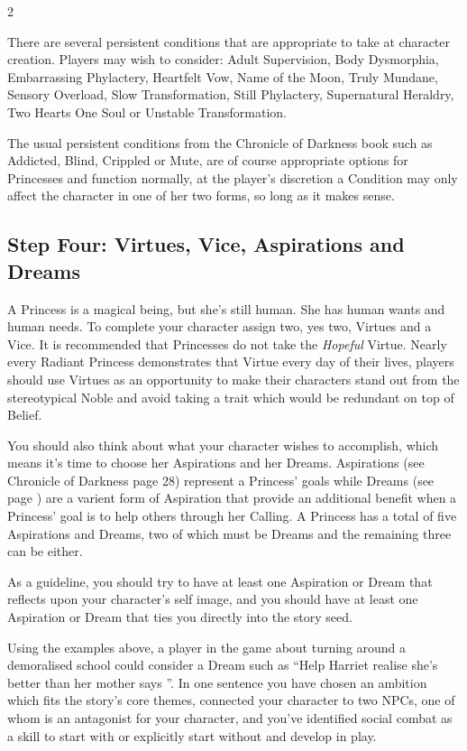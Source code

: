 \begin{multicols}{2}
\begin{mybox}
There are several persistent conditions that are appropriate to take at character creation. Players may wish to consider: Adult Supervision, Body Dysmorphia, Embarrassing Phylactery, Heartfelt Vow, Name of the Moon, Truly Mundane, Sensory Overload, Slow Transformation, Still Phylactery, Supernatural Heraldry, Two Hearts One Soul or Unstable Transformation. 

The usual persistent conditions from the Chronicle of Darkness book such as Addicted, Blind, Crippled or Mute, are of course appropriate options for Princesses and function normally, at the player's discretion a Condition may only affect the character in one of her two forms, so long as it makes sense.

\end{mybox}


\subsection*{Step Four: Virtues, Vice, Aspirations and Dreams}   

A Princess is a magical being, but she's still human. She has human wants and human needs. To complete your character assign two, yes two, Virtues and a Vice. It is recommended that Princesses do not take the \textit{Hopeful} Virtue. Nearly every Radiant Princess demonstrates that Virtue every day of their lives, players should use Virtues as an opportunity to make their characters stand out from the stereotypical Noble and avoid taking a trait which would be redundant on top of Belief.  

You should also think about what your character wishes to accomplish, which means it's time to choose her Aspirations and her Dreams. Aspirations (see Chronicle of Darkness page 28) represent a Princess' goals while Dreams (see page \pageref{subsec:Dreams}) are a varient form of Aspiration that provide an additional benefit when a Princess' goal is to help others through her Calling. A Princess has a total of five Aspirations and Dreams, two of which must be Dreams and the remaining three can be either. 

As a guideline, you should try to have at least one Aspiration or Dream that reflects upon your character's self image, and you should have at least one Aspiration or Dream that ties you directly into the story seed. 

Using the examples above, a player in the game about turning around a demoralised school could consider a Dream such as \textquotedblleft Help Harriet realise she's better than her mother says \textquotedblright. In one sentence you have chosen an ambition which fits the story's core themes, connected your character to two NPCs, one of whom is an antagonist for your character, and you've identified social combat as a skill to start with or explicitly start without and develop in play. 


\end{multicols}
